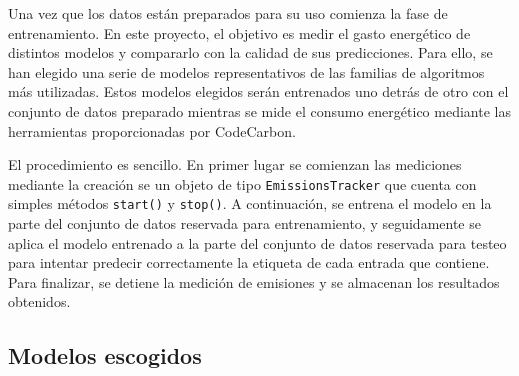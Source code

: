 Una vez que los datos están preparados para su uso comienza la fase de entrenamiento. En este proyecto, el objetivo es medir el gasto energético de distintos modelos y compararlo con la calidad de sus predicciones. Para ello, se han elegido una serie de modelos representativos de las familias de algoritmos más utilizadas. Estos modelos elegidos serán entrenados uno detrás de otro con el conjunto de datos preparado mientras se mide el consumo energético mediante las herramientas proporcionadas por CodeCarbon.

El procedimiento es sencillo. En primer lugar se comienzan las mediciones mediante la creación se un objeto de tipo \texttt{EmissionsTracker} que cuenta con simples métodos \texttt{start()} y \texttt{stop()}. A continuación, se entrena el modelo en la parte del conjunto de datos reservada para entrenamiento, y seguidamente se aplica el modelo entrenado a la parte del conjunto de datos reservada para testeo para intentar predecir correctamente la etiqueta de cada entrada que contiene. Para finalizar, se detiene la medición de emisiones y se almacenan los resultados obtenidos.


\subsection{Modelos escogidos}
\label{subsec:models-short}

